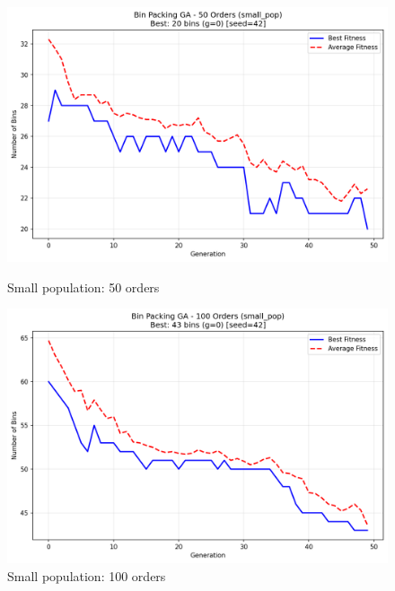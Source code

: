 \documentclass[journal,12pt,onecolumn]{IEEEtran}
\begin{document}
\begin{figure}[htbp]
\begin{minipage}{0.48\textwidth}
    \centering
    \includegraphics[width=\textwidth]{bpp_50items_small_pop_seed42.png}
    \caption{Small population: 50 orders}
    \label{fig:small_pop_50}
\end{minipage}\hfill
\begin{minipage}{0.48\textwidth}
    \centering
    \includegraphics[width=\textwidth]{bpp_100items_small_pop_seed42.png}
    \caption{Small population: 100 orders}
    \label{fig:small_pop_100}
\end{minipage}
\end{figure}
\end{document}
